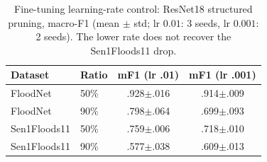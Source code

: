 \documentclass[conference]{IEEEtran}
\newif\ifreview
\newcommand{\REV}[1]{\ifreview\textcolor{red}{\textbf{[Revise: #1]}}\fi}
\begin{document}
\begin{table}[t]
\centering
\caption{Fine-tuning learning-rate control: ResNet18 structured
pruning, macro-F1 (mean $\pm$ std; lr $0.01$: 3 seeds, lr $0.001$: 2
seeds). The lower rate does not recover the Sen1Floods11 drop.}
\label{tab:lrcontrol}
\footnotesize
\begin{tabular}{llcc}
\toprule
\textbf{Dataset} & \textbf{Ratio} & \textbf{mF1 (lr .01)} &
\textbf{mF1 (lr .001)}\\
\midrule
FloodNet     & 50\% & .928$\pm$.016 & .914$\pm$.009\\
FloodNet     & 90\% & .798$\pm$.064 & .699$\pm$.093\\
Sen1Floods11 & 50\% & .759$\pm$.006 & .718$\pm$.010\\
Sen1Floods11 & 90\% & .577$\pm$.038 & .609$\pm$.013\\
\bottomrule
\end{tabular}
\end{table}
\REV{[B4] Strengthen: add a third column with a \emph{better} recipe
(momentum 0.9 + weight decay $5\!\times\!10^{-4}$, or the same SGD but
150 epochs) for SAR 50\% and FloodNet 50\%, 3 seeds. If the SAR gap
persists under a stronger recipe, the claim becomes much safer. Report
std only if $n\geq3$.}
\end{document}
